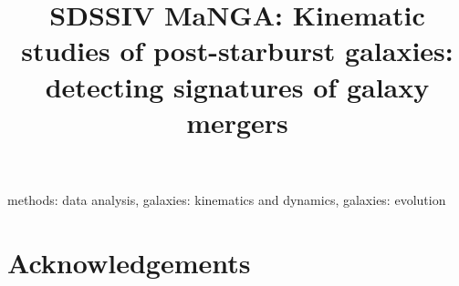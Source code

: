 \documentclass[11pt,fleqn,usenatbib]{mnras} %
\title[Kinematics of post-starburst galaxies]{SDSS\-IV MaNGA: Kinematic studies of post-starburst galaxies: detecting signatures of galaxy mergers}
\begin{document}



\begingroup
\let\clearpage\relax
\tableofcontents
\listoftables
\listoffigures
\endgroup



\label{firstpage}
\pagerange{\pageref{firstpage}--\pageref{lastpage}}
\maketitle

\newpage

\begin{abstract}

\end{abstract}

\begin{keywords}
methods: data analysis, galaxies: kinematics and dynamics, galaxies: evolution
\end{keywords}












\section*{Acknowledgements}




 


\appendix




\bsp	%
\label{lastpage}
\end{document}
